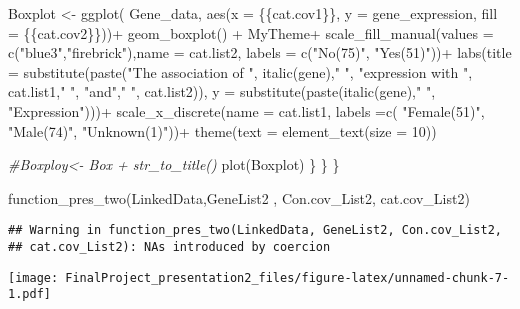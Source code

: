 \documentclass[
]{article}
\newenvironment{Shaded}{\begin{snugshade}}{\end{snugshade}}
\newcommand{\AttributeTok}[1]{\textcolor[rgb]{0.77,0.63,0.00}{#1}}
\newcommand{\CommentTok}[1]{\textcolor[rgb]{0.56,0.35,0.01}{\textit{#1}}}
\newcommand{\DecValTok}[1]{\textcolor[rgb]{0.00,0.00,0.81}{#1}}
\newcommand{\FunctionTok}[1]{\textcolor[rgb]{0.00,0.00,0.00}{#1}}
\newcommand{\NormalTok}[1]{#1}
\newcommand{\OtherTok}[1]{\textcolor[rgb]{0.56,0.35,0.01}{#1}}
\newcommand{\SpecialCharTok}[1]{\textcolor[rgb]{0.00,0.00,0.00}{#1}}
\newcommand{\StringTok}[1]{\textcolor[rgb]{0.31,0.60,0.02}{#1}}
\begin{document}
\begin{Shaded}
\begin{Highlighting}[]
\NormalTok{Boxplot }\OtherTok{\textless{}{-}} \FunctionTok{ggplot}\NormalTok{( Gene\_data, }\FunctionTok{aes}\NormalTok{(}\AttributeTok{x =}\NormalTok{ \{\{cat.cov1\}\}, }\AttributeTok{y =}\NormalTok{ gene\_expression, }\AttributeTok{fill =}\NormalTok{ \{\{cat.cov2\}\}))}\SpecialCharTok{+}
  \FunctionTok{geom\_boxplot}\NormalTok{() }\SpecialCharTok{+}
\NormalTok{  MyTheme}\SpecialCharTok{+}
  \FunctionTok{scale\_fill\_manual}\NormalTok{(}\AttributeTok{values =} \FunctionTok{c}\NormalTok{(}\StringTok{"blue3"}\NormalTok{,}\StringTok{"firebrick"}\NormalTok{),}\AttributeTok{name =}\NormalTok{ cat.list2, }\AttributeTok{labels =} \FunctionTok{c}\NormalTok{(}\StringTok{"No(75)"}\NormalTok{, }\StringTok{"Yes(51)"}\NormalTok{))}\SpecialCharTok{+}
  \FunctionTok{labs}\NormalTok{(}\AttributeTok{title =} \FunctionTok{substitute}\NormalTok{(}\FunctionTok{paste}\NormalTok{(}\StringTok{"The association of "}\NormalTok{, }\FunctionTok{italic}\NormalTok{(gene),}\StringTok{" "}\NormalTok{, }\StringTok{"expression with "}\NormalTok{, cat.list1,}\StringTok{" "}\NormalTok{, }\StringTok{"and"}\NormalTok{,}\StringTok{" "}\NormalTok{, cat.list2)), }\AttributeTok{y =} \FunctionTok{substitute}\NormalTok{(}\FunctionTok{paste}\NormalTok{(}\FunctionTok{italic}\NormalTok{(gene),}\StringTok{" "}\NormalTok{, }\StringTok{"Expression"}\NormalTok{)))}\SpecialCharTok{+}
  \FunctionTok{scale\_x\_discrete}\NormalTok{(}\AttributeTok{name =}\NormalTok{ cat.list1, }\AttributeTok{labels =}\FunctionTok{c}\NormalTok{( }\StringTok{"Female(51)"}\NormalTok{, }\StringTok{"Male(74)"}\NormalTok{, }\StringTok{"Unknown(1)"}\NormalTok{))}\SpecialCharTok{+}
  \FunctionTok{theme}\NormalTok{(}\AttributeTok{text =} \FunctionTok{element\_text}\NormalTok{(}\AttributeTok{size =} \DecValTok{10}\NormalTok{))}

\CommentTok{\#Boxploy\textless{}{-} Box + str\_to\_title()}
\FunctionTok{plot}\NormalTok{(Boxplot)}
\NormalTok{\}}
\NormalTok{  \}}
\NormalTok{\}}

\FunctionTok{function\_pres\_two}\NormalTok{(LinkedData,GeneList2 , Con.cov\_List2, cat.cov\_List2)}
\end{Highlighting}
\end{Shaded}

\begin{verbatim}
## Warning in function_pres_two(LinkedData, GeneList2, Con.cov_List2,
## cat.cov_List2): NAs introduced by coercion
\end{verbatim}

\texttt{[image: FinalProject\_presentation2\_files/figure-latex/unnamed-chunk-7-1.pdf]}
\end{document}
